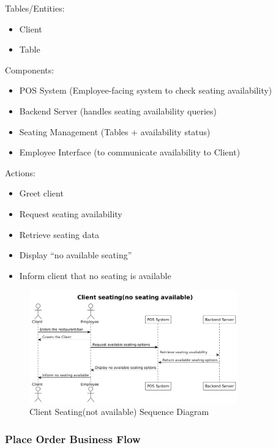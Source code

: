 \documentclass[]{VUMIFTemplateClass}
\begin{document}
Tables/Entities:
\begin{itemize}
\setlength{\itemsep}{2pt}
\setlength{\parskip}{0pt}
\setlength{\parsep}{0pt}
\item Client
\item Table
\end{itemize}

Components:
\begin{itemize}
\setlength{\itemsep}{2pt}
\setlength{\parskip}{0pt}
\setlength{\parsep}{0pt}
\item POS System (Employee-facing system to check seating availability)
\item Backend Server (handles seating availability queries)
\item Seating Management (Tables + availability status)
\item Employee Interface (to communicate availability to Client)
\end{itemize}

Actions:
\begin{itemize}
\setlength{\itemsep}{2pt}
\setlength{\parskip}{0pt}
\setlength{\parsep}{0pt}
\item Greet client
\item Request seating availability
\item Retrieve seating data
\item Display “no available seating”
\item Inform client that no seating is available
\end{itemize}

\begin{figure}[H]
    \centering
    \includegraphics[width=0.8\textwidth]{images/diagrams/orders/order_client_seating_not_available_sequence.png}
    \caption{Client Seating(not available) Sequence Diagram}
    \label{fig:client_seating_not_available_sequence}
\end{figure}

\subsubsection{Place Order Business Flow}
\end{document}
